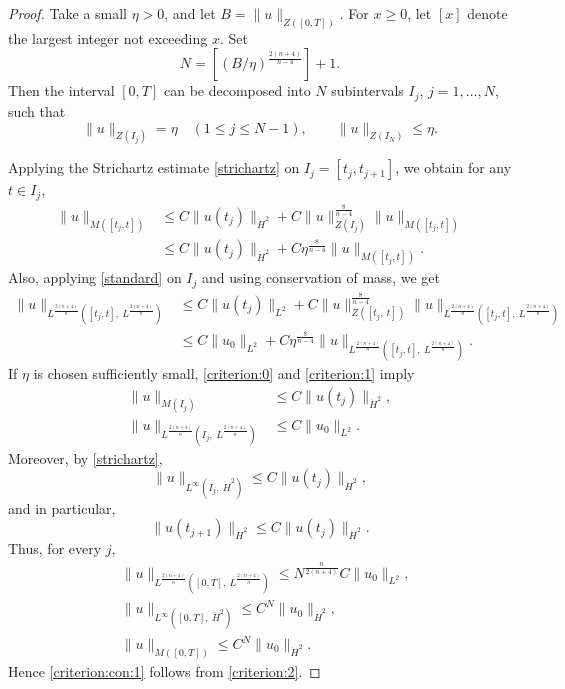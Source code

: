 \documentclass[11pt,a4paper]{article}
\numberwithin{equation}{section}
\begin{document}
\begin{proof}
Take a small $\eta > 0$, and let $B = \|u\|_{Z([0, T])}$. For $x \geq 0$, let $[x]$ denote the largest integer not exceeding $x$.
Set
\[
N = \left[ (B/\eta)^{\frac{2(n+4)}{n-4}} \right] + 1.
\]
Then the interval $[0, T]$ can be decomposed into $N$ subintervals $I_{j}$, $j=1,\dots,N$, such that
\[
\|u\|_{Z(I_{j})} = \eta \quad (1 \leq j \leq N - 1), \qquad \|u\|_{Z(I_{N})} \leq \eta.
\]

Applying the Strichartz estimate \eqref{strichartz} on $I_{j} = [t_{j}, t_{j+1}]$, we obtain for any $t \in I_{j}$,
\begin{equation}\label{criterion:0}
\begin{aligned}
\|u\|_{M([t_{j}, t])}
&\leq C\|u(t_{j})\|_{\dot{H}^{2}} + C\|u\|_{Z(I_{j})}^{\frac{8}{n-4}}\|u\|_{M([t_{j}, t])} \\
&\leq C\|u(t_{j})\|_{\dot{H}^{2}} + C\eta^{\frac{8}{n-4}}\|u\|_{M([t_{j}, t])}.
\end{aligned}
\end{equation}
Also, applying \eqref{standard} on $I_{j}$ and using conservation of mass, we get
\begin{equation}\label{criterion:1}
\begin{aligned}
\|u\|_{L^{\frac{2(n+4)}{n}}([t_{j}, t], \ L^{\frac{2(n+4)}{n}})}
&\leq C\|u(t_{j})\|_{L^{2}} + C\|u\|_{Z([t_{j},\ t])}^{\frac{8}{n-4}}\|u\|_{L^{\frac{2(n+4)}{n}}([t_{j}, t], \ L^{\frac{2(n+4)}{n}})} \\
&\leq C\|u_{0}\|_{L^{2}} + C\eta^{\frac{8}{n-4}}\|u\|_{L^{\frac{2(n+4)}{n}}([t_{j}, t], \ L^{\frac{2(n+4)}{n}})}.
\end{aligned}
\end{equation}
If $\eta$ is chosen sufficiently small, \eqref{criterion:0} and \eqref{criterion:1} imply
\begin{align*}
\|u\|_{M(I_{j})} &\leq C\|u(t_{j})\|_{\dot{H}^{2}}, \\
\|u\|_{L^{\frac{2(n+4)}{n}}(I_{j}, \ L^{\frac{2(n+4)}{n}})} &\leq C\|u_{0}\|_{L^{2}}.
\end{align*}
Moreover, by \eqref{strichartz},
\[
\|u\|_{L^{\infty}(I_{j},\ \dot{H}^{2})} \leq C\|u(t_{j})\|_{\dot{H}^{2}},
\]
and in particular,
\[
\|u(t_{j+1})\|_{\dot{H}^{2}} \leq C\|u(t_{j})\|_{\dot{H}^{2}}.
\]
Thus, for every $j$,
\begin{equation}\label{criterion:2}
\begin{aligned}
&\|u\|_{L^{\frac{2(n+4)}{n}}([0, T], \ L^{\frac{2(n+4)}{n}})} \leq N^{\frac{n}{2(n+4)}}C\|u_{0}\|_{L^{2}}, \\
&\|u\|_{L^{\infty}([0,T],\ \dot{H}^{2})} \leq C^{N}\|u_{0}\|_{\dot{H}^{2}}, \\
&\|u\|_{M([0,T])} \leq C^{N}\|u_{0}\|_{\dot{H}^{2}}.
\end{aligned}
\end{equation}
Hence \eqref{criterion:con:1} follows from \eqref{criterion:2}.


\end{proof}
\end{document}
